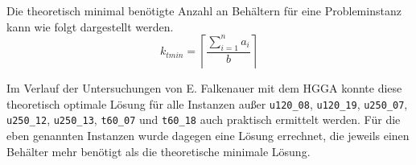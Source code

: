     Die theoretisch minimal benötigte Anzahl an Behältern für eine Probleminstanz kann wie folgt dargestellt werden. $$k_{tmin} = \left\lceil \frac{\sum_{i=1}^{n} a_i}{b} \right\rceil$$

Im Verlauf der Untersuchungen von E. Falkenauer mit dem HGGA konnte diese theoretisch optimale Lösung für alle Instanzen außer \texttt{u120\_08}, \texttt{u120\_19}, \texttt{u250\_07}, \texttt{u250\_12}, \texttt{u250\_13}, \texttt{t60\_07} und \texttt{t60\_18} auch praktisch ermittelt werden. Für die eben genannten Instanzen wurde dagegen eine Lösung errechnet, die jeweils einen Behälter mehr benötigt als die theoretische minimale Lösung. \parencite[19-22]{Falkenauer:1996} 
    
    
    \clearpage
    \pagestyle{empty}
    \printbibliography[heading=bibintoc]



